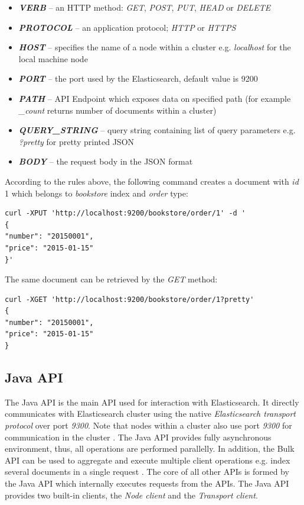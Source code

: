 \documentclass[12pt,oneside]{fithesis2}
\begin{document}
\begin{itemize}
	\item \textit{\textbf{VERB}} -- an HTTP method: \textit{GET}, \textit{POST}, \textit{PUT}, \textit{HEAD} or \textit{DELETE}
	\item \textit{\textbf{PROTOCOL}} -- an application protocol; \textit{HTTP} or \textit{HTTPS}
	\item \textit{\textbf{HOST}} -- specifies the name of a node within a cluster e.g. \textit{localhost} for the local machine node
	\item \textit{\textbf{PORT}} -- the port used by the Elasticsearch, default value is 9200
	\item \textit{\textbf{PATH}} -- API Endpoint which exposes data on specified path (for example \textit{\_count} returns number of documents within a cluster)
	\item \textit{\textbf{QUERY\_STRING}} -- query string containing list of query parameters e.g. \textit{?pretty} for pretty printed JSON
	\item \textit{\textbf{BODY}} -- the request body in the JSON format
\end{itemize}

According to the rules above, the following command creates a document with \textit{id} 1 which belongs to \textit{bookstore} index and \textit{order} type:

\begin{lstlisting}[caption = Example of indexing data in Elasticsearch, label = elastic_xput]
curl -XPUT 'http://localhost:9200/bookstore/order/1' -d '
{ 
"number": "20150001", 
"price": "2015-01-15"
}'
\end{lstlisting}

The same document can be retrieved by the \textit{GET} method:
\begin{lstlisting}[caption = Example of retrieving data from Elasticsearch, label = elastic_xget]
curl -XGET 'http://localhost:9200/bookstore/order/1?pretty'
{ 
"number": "20150001", 
"price": "2015-01-15"
}
\end{lstlisting}

\subsection{Java API}
The Java API is the main API used for interaction with Elasticsearch. It directly communicates with Elasticsearch cluster using the native \textit{Elasticsearch transport protocol} over port \textit{9300}. Note that nodes within a cluster also use port \textit{9300} for communication in the cluster \cite[Talking to Elasticsearch]{elasticsearch_defnitive_guide}. The Java API provides fully asynchronous environment, thus, all operations are performed parallelly. In addition, the Bulk API can be used to aggregate and execute multiple client operations e.g. index several documents in a single request \cite[Java API]{elasticsearch_java_api_doc}. The core of all other APIs \cite{elasticsearch_doc} is formed by the Java API which internally executes requests from the APIs. The Java API provides two built-in clients, the \textit{Node client} and the \textit{Transport client}.
\end{document}
